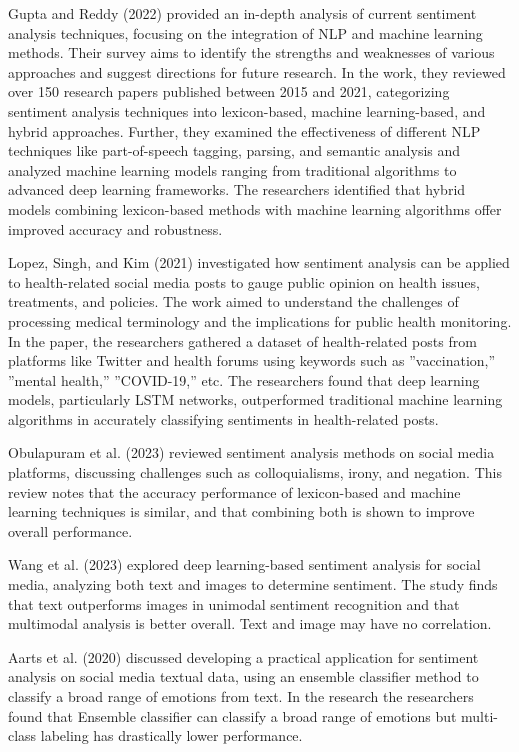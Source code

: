 \documentclass{IEEEtran}
\begin{document}
Gupta and Reddy (2022) provided an in-depth analysis of current sentiment analysis techniques, focusing on the integration of NLP and machine learning methods. Their survey aims to identify the strengths and weaknesses of various approaches and suggest directions for future research. In the work, they reviewed over 150 research papers published between 2015 and 2021, categorizing sentiment analysis techniques into lexicon-based, machine learning-based, and hybrid approaches. Further, they examined the effectiveness of different NLP techniques like part-of-speech tagging, parsing, and semantic analysis and analyzed machine learning models ranging from traditional algorithms to advanced deep learning frameworks. The researchers identified that hybrid models combining lexicon-based methods with machine learning algorithms offer improved accuracy and robustness.

Lopez, Singh, and Kim (2021) investigated how sentiment analysis can be applied to health-related social media posts to gauge public opinion on health issues, treatments, and policies. The work aimed to understand the challenges of processing medical terminology and the implications for public health monitoring. In the paper, the researchers gathered a dataset of health-related posts from platforms like Twitter and health forums using keywords such as ”vaccination,” ”mental health,” ”COVID-19,” etc.  The researchers found that deep learning models, particularly LSTM networks, outperformed traditional machine learning algorithms in accurately classifying sentiments in health-related posts.

Obulapuram et al. (2023) reviewed sentiment analysis methods on social media platforms, discussing challenges such as colloquialisms, irony, and negation. This review notes that the accuracy performance of lexicon-based and machine learning techniques is similar, and that combining both is shown to improve overall performance.

Wang et al. (2023) explored deep learning-based sentiment analysis for social media, analyzing both text and images to determine sentiment. The study finds that text outperforms images in unimodal sentiment recognition and that multimodal analysis is better overall. Text and image may have no correlation.

Aarts et al. (2020) discussed developing a practical application for sentiment analysis on social media textual data, using an ensemble classifier method to classify a broad range of emotions from text. In the research the researchers found that Ensemble classifier can classify a broad range of emotions but multi-class labeling has drastically lower performance.
\end{document}
